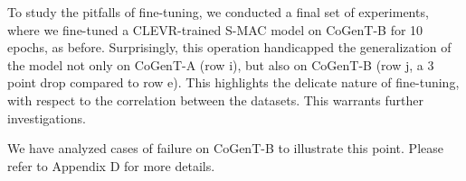 To study the pitfalls of fine-tuning, we conducted a final set of experiments, where we fine-tuned a CLEVR-trained S-MAC model on CoGenT-B for 10 epochs, as before. Surprisingly, this operation handicapped the generalization of the model not only on CoGenT-A (row i), but also on CoGenT-B (row j, a 3 point drop compared to row e). This highlights the delicate nature of fine-tuning, with respect to the correlation between the datasets. This warrants further investigations.

We have analyzed cases of failure on CoGenT-B to illustrate this point. Please refer to Appendix D for more details.
